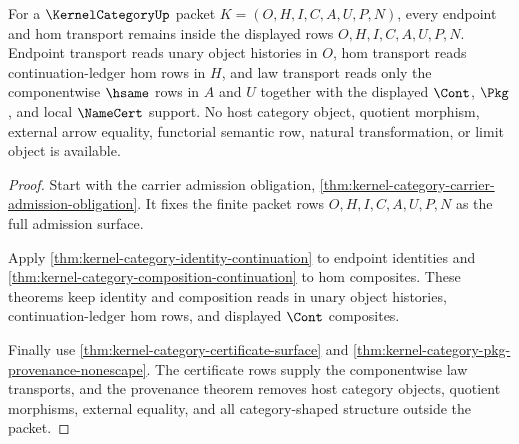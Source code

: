\begin{theorem}
\label{thm:kernel-category-root-transport-nonescape}
For a $\KernelCategoryUp$ packet $K=(O,H,I,C,A,U,P,N)$, every endpoint and hom transport remains inside the displayed rows $O,H,I,C,A,U,P,N$. Endpoint transport reads unary object histories in $O$, hom transport reads continuation-ledger hom rows in $H$, and law transport reads only the componentwise $\hsame$ rows in $A$ and $U$ together with the displayed $\Cont$, $\Pkg$, and local $\NameCert$ support. No host category object, quotient morphism, external arrow equality, functorial semantic row, natural transformation, or limit object is available.
\end{theorem}
\begin{proof}
Start with the carrier admission obligation, \autoref{thm:kernel-category-carrier-admission-obligation}. It fixes the finite packet rows $O,H,I,C,A,U,P,N$ as the full admission surface.

Apply \autoref{thm:kernel-category-identity-continuation} to endpoint identities and \autoref{thm:kernel-category-composition-continuation} to hom composites. These theorems keep identity and composition reads in unary object histories, continuation-ledger hom rows, and displayed $\Cont$ composites.

Finally use \autoref{thm:kernel-category-certificate-surface} and \autoref{thm:kernel-category-pkg-provenance-nonescape}. The certificate rows supply the componentwise law transports, and the provenance theorem removes host category objects, quotient morphisms, external equality, and all category-shaped structure outside the packet.
\end{proof}

